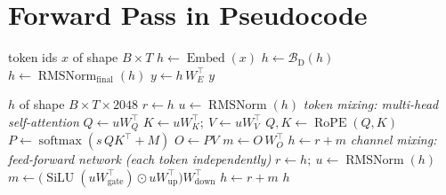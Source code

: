 \documentclass[10pt,a4paper]{article}
\newcommand{\op}[1]{\operatorname{#1}}
\begin{document}
\section{Forward Pass in Pseudocode}\label{sec:algo}
\begin{algorithm}[H]
\caption{Llama-3.2-1B-Instruct: full forward pass}
\begin{algorithmic}[1]
\Require token ids $x$ of shape $B\times T$
\State $h \gets \op{Embed}(x)$ 
 
\State $h \gets \mathcal{B}_{\mathrm{D}}(h)$ 
\EndFor
\State $h \gets \op{RMSNorm}_{\mathrm{final}}(h)$
\State $y \gets h\,W_E^{\top}$ 
\State \Return $y$ 
\end{algorithmic}
\end{algorithm}
\begin{algorithm}[H]
\caption{Block $\mathcal{B}_{\mathrm{D}}(h)$ --- Decoder block}
\begin{algorithmic}[1]
\Require $h$ of shape $B\times T\times 2048$
\State $r \gets h$ 
\State $u \gets \op{RMSNorm}(h)$ 
\Statex \hspace{-1.2em}\textit{token mixing: multi-head self-attention}
\State $Q \gets u W_Q^{\top}$ 
\State $K \gets u W_K^{\top};\ V \gets u W_V^{\top}$ 
\State $Q, K \gets \op{RoPE}(Q, K)$ 
\State $P \gets \op{softmax}(s\, Q K^{\top} + M)$ 
\State $O \gets P V$ 
\State $m \gets O\, W_O^{\top}$ 
\State $h \gets r + m$ 
\Statex \hspace{-1.2em}\textit{channel mixing: feed-forward network (each token independently)}
\State $r \gets h;\ u \gets \op{RMSNorm}(h)$
\State $m \gets \big(\op{SiLU}(u W_{\mathrm{gate}}^{\top}) \odot u W_{\mathrm{up}}^{\top}\big) W_{\mathrm{down}}^{\top}$ 
\State $h \gets r + m$ 
\State \Return $h$
\end{algorithmic}
\end{algorithm}
\end{document}
